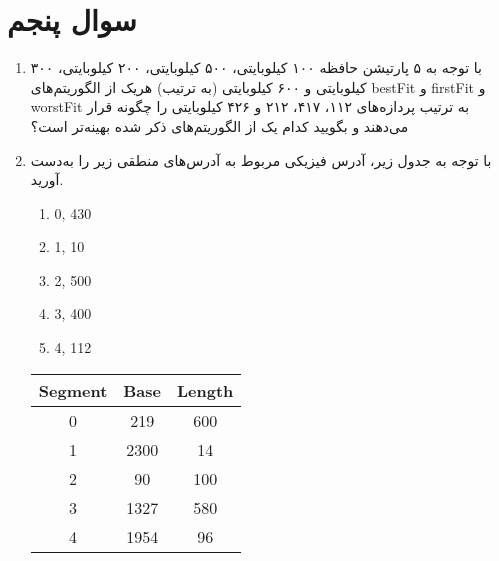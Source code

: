 \section{سوال پنجم}

\begin{enumerate}
	\item با توجه به ۵ پارتیشن حافظه ۱۰۰ کیلوبایتی، ۵۰۰ کیلوبایتی، ۲۰۰ کیلوبایتی، ۳۰۰ کیلوبایتی و ۶۰۰ کیلوبایتی (به ترتیب) هریک از الگوریتم‌های bestFit و firstFit و worstFit به ترتیب پردازه‌های ۱۱۲، ۴۱۷، ۲۱۲ و ۴۲۶ کیلوبایتی را چگونه قرار می‌دهند و بگویید کدام یک از الگوریتم‌های ذکر شده بهینه‌تر است؟
	
	
	
	\item با توجه به جدول زیر، آدرس فیزیکی مربوط به آدرس‌های منطقی زیر را به‌دست آورید.
	
	\begin{latin}
		\begin{enumerate}
			\item 0, 430
			\item 1, 10
			\item 2, 500
			\item 3, 400
			\item 4, 112
		\end{enumerate}
		\begin{center}
			\begin{tabular}{||c c c||} 
				\hline
				Segment & Base & Length \\ [0.5ex] 
				\hline\hline
				0 & 219 & 600\\ 
				
				1 & 2300 & 14 \\
				
				2 & 90 & 100 \\
				
				3 & 1327 & 580 \\
				
				4 & 1954 & 96 \\ [1ex] 
				\hline
			\end{tabular}
		\end{center}
	\end{latin}
	
\end{enumerate}







